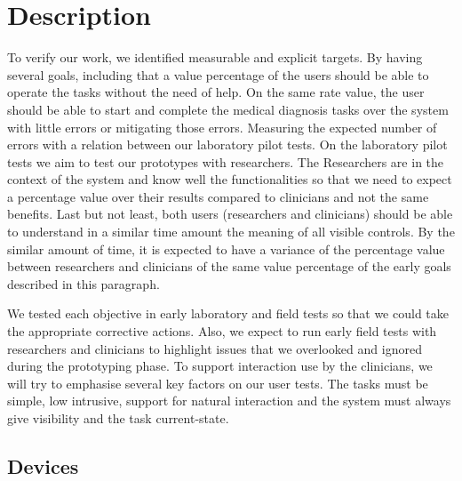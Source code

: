 
\section{Description}
\label{sec:sec002}

To verify our work, we identified measurable and explicit targets. By having several goals, including that a value percentage of the users should be able to operate the tasks without the need of help. On the same rate value, the user should be able to start and complete the medical diagnosis tasks over the system with little errors or mitigating those errors. Measuring the expected number of errors with a relation between our laboratory pilot tests. On the laboratory pilot tests we aim to test our prototypes with researchers. The Researchers are in the context of the system and know well the functionalities so that we need to expect a percentage value over their results compared to clinicians and not the same benefits. Last but not least, both users (researchers and clinicians) should be able to understand in a similar time amount the meaning of all visible controls. By the similar amount of time, it is expected to have a variance of the percentage value between researchers and clinicians of the same value percentage of the early goals described in this paragraph.

We tested each objective in early laboratory and field tests so that we could take the appropriate corrective actions. Also, we expect to run early field tests with researchers and clinicians to highlight issues that we overlooked and ignored during the prototyping phase. To support interaction use by the clinicians, we will try to emphasise several key factors on our user tests. The tasks must be simple, low intrusive, support for natural interaction and the system must always give visibility and the task current-state.

\clearpage


\subsection{Devices}


